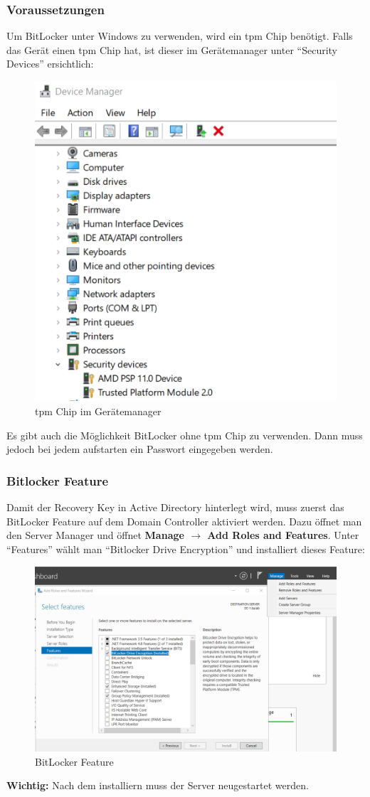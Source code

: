 \subsubsection{Voraussetzungen}
Um BitLocker unter Windows zu verwenden, wird ein \acrfull{tpm} Chip benötigt.
Falls das Gerät einen \acrshort{tpm} Chip hat, ist dieser im Gerätemanager unter ``Security Devices'' ersichtlich:
\begin{figure}[H]
    \centering
    \includegraphics[width=0.6\linewidth]{../img/Encryption/tpm-chip-device-manager.png}
    \caption{\acrshort{tpm} Chip im Gerätemanager}
\end{figure}
Es gibt auch die Möglichkeit BitLocker ohne \acrshort{tpm} Chip zu verwenden. Dann muss jedoch bei jedem aufstarten ein Passwort eingegeben werden.

\subsubsection{Bitlocker Feature}
Damit der Recovery Key in Active Directory hinterlegt wird, muss zuerst das BitLocker Feature auf dem Domain Controller aktiviert werden.
Dazu öffnet man den Server Manager und öffnet \textbf{Manage $\rightarrow$ Add Roles and Features}.
Unter ``Features'' wählt man ``Bitlocker Drive Encryption'' und installiert dieses Feature:
\begin{figure}[H]
    \centering
    \includegraphics[width=0.7\linewidth]{../img/Encryption/bitlocker-feature.png}
    \caption{BitLocker Feature}
\end{figure}
\textbf{Wichtig:} Nach dem installiern muss der Server neugestartet werden.

